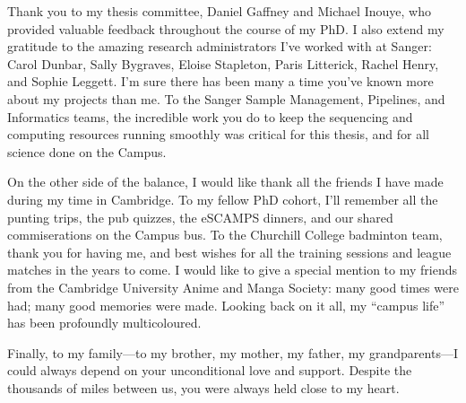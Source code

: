 Thank you to my thesis committee, Daniel Gaffney and Michael Inouye, who provided valuable feedback throughout the course of my PhD.
I also extend my gratitude to the amazing research administrators I've worked with at Sanger: Carol Dunbar, Sally Bygraves, Eloise Stapleton, Paris Litterick, Rachel Henry, and Sophie Leggett.
I'm sure there has been many a time you've known more about my projects than me. 
To the Sanger Sample Management, Pipelines, and Informatics teams,
the incredible work you do to keep the sequencing and computing resources running smoothly was critical for this thesis, and for all science done on the Campus.

On the other side of the balance, I would like thank all the friends I have made during my time in Cambridge.
To my fellow PhD cohort, 
I'll remember all the punting trips, the pub quizzes, the eSCAMPS dinners,
and our shared commiserations on the Campus bus.
To the Churchill College badminton team,
thank you for having me, and best wishes for all the training sessions and league matches in the years to come.
I would like to give a special mention to my friends from the Cambridge University Anime and Manga Society:
many good times were had; many good memories were made.
Looking back on it all,
my \enquote{campus life} has been profoundly multicoloured.

Finally, to my family---to my brother, my mother, my father, my grandparents---I could always depend on your unconditional love and support.
Despite the thousands of miles between us, you were always held close to my heart.
%
